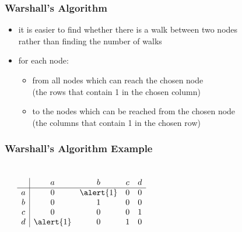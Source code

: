 \documentclass[dvipsnames]{beamer}
\begin{document}
\begin{frame}
  \frametitle{Warshall's Algorithm}

  \begin{itemize}
    \item it is easier to find whether there is a walk between two nodes\\
      rather than finding the number of walks

    \pause
    \medskip
    \item for each node:
    \begin{itemize}
      \item from all nodes which can reach the chosen node\\
        (the rows that contain 1 in the chosen column)

      \item to the nodes which can be reached from the chosen node\\
        (the columns that contain 1 in the chosen row)
    \end{itemize}
  \end{itemize}
\end{frame}

\begin{frame}
  \frametitle{Warshall's Algorithm Example}

  \begin{example}
    \begin{columns}
      \begin{center}
      \end{center}

      \[
        \begin{array}{c|cccc}
              & a & b & c & d\\\hline
            a & 0 & \alert{1} & 0 & 0\\
            b & 0 & 1 & 0 & 0\\
            c & 0 & 0 & 0 & 1\\
            d & \alert{1} & 0 & 1 & 0
        \end{array}
      \]
    \end{columns}
  \end{example}
\end{frame}
\end{document}

